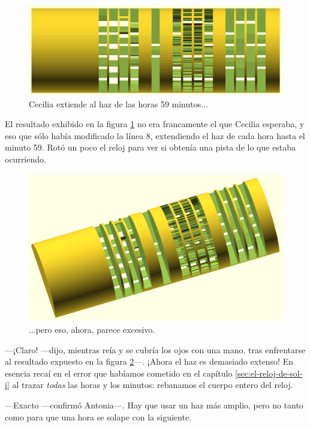 \begin{figure}[ht]
  \centering
  \includegraphics[width=.9\textwidth]{imagenes/hora-unidades-5}  
  \caption{Cecilia extiende al haz de las horas 59 minutos...}
  \label{fig:hora-unidades-5}
\end{figure}


El resultado exhibido en la figura \ref{fig:hora-unidades-5} no era
francamente el que Cecilia esperaba, y eso que sólo había modificado
la línea 8, extendiendo el haz de cada hora hasta el minuto 59. Rotó
un poco el reloj para ver si obtenía una pista de lo que estaba
ocurriendo.


\begin{figure}[ht]
  \centering
  \includegraphics[width=.95\textwidth]{imagenes/hora-unidades-4}  
  \caption{...pero eso, ahora, parece excesivo.}
  \label{fig:hora-unidades-4}
\end{figure}


---¡Claro! ---dijo, mientras reía y se cubría los ojos con una mano,
tras enfrentarse al resultado expuesto en la figura
\ref{fig:hora-unidades-4}---. ¡Ahora el haz es demasiado extenso! En
esencia recaí en el error que habíamos cometido en el capítulo
\ref{sec:el-reloj-de-sol-i} al trazar \emph{todas} las horas y los
minutos: rebanamos el cuerpo entero del reloj.

---Exacto ---confirmó Antonia---. Hay que usar un haz más amplio, pero
no tanto como para que una hora se solape con la siguiente.


